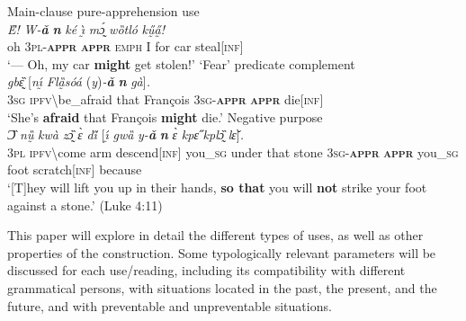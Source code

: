 \documentclass[output=paper,colorlinks,citecolor=brown]{langscibook}
\begin{document}
\ea \label{ex:Fed1} \textnormal{Main-clause pure-apprehension use} \\
\gll \textit{E̋!} \textit{W-\textbf{ǎ}} \textit{\textbf{n{\ù}}} \textit{ké} \textit{ı̰̀} \textit{mɔ̰́} \textit{wȍtló} \textit{kṵ̋a̰̋!} \\
oh \textsc{3pl-\textbf{appr}} \textsc{\textbf{appr}} \textsc{emph} I for car steal\textsc{[inf]} \\
 `--- Oh, my car \textbf{might} get stolen!'
\ex \label{ex:Fed2} \textnormal{`Fear' predicate complement}\\
\gll \textit{{\E}} \textit{gbɛ̰̏} \textup{[}\textit{n\'{ı̰}} \textit{Flȁ̰sóá} \textup{(}\textit{y}\textup{)}\textit{-\textbf{ǎ}} \textit{\textbf{n{\ù}}} \textit{gà}\textup{]}\textit{.} \\
\textsc{3sg} \textsc{\textsc{ipfv}\backslash}be\_afraid that François \textsc{3sg-\textbf{appr}} \textsc{\textbf{appr}} die\textsc{[inf]} \\
\glt `She's \textbf{afraid} that François \textbf{might} die.'
\ex \label{ex:Fed3} \textnormal{Negative purpose} \\
\gll \textit{Ɔ̏} \textit{nṵ̏} \textit{kwà} \textit{zɔ̰̏} \textit{ɛ̀} \textit{di̋} \textup{[}\textit{ı̰́} \textit{gwȁ} \textit{y-\textbf{ǎ}} \textit{\textbf{n{\ù}}} \textit{ɛ̀} \textit{kpɛ̋} \textit{kplɔ̰̏} \textit{lɛ̌}\textup{]}\textit{.} \\
\textsc{3pl} \textsc{ipfv}\backslash come arm descend\textsc{[inf]} {you\_\textsc{sg}} under that stone \textsc{3sg-\textbf{appr}} \textsc{\textbf{appr}} you\_\textsc{sg} foot scratch\textsc{[inf]} because \\
\glt `[T]hey will lift you up in their hands, \textbf{so that} you will \textbf{not} strike your foot against a stone.' (Luke 4:11)
\z


This paper will explore in detail the different types of uses, as well as other properties of the construction. Some typologically relevant parameters will be discussed for each use\slash reading, including its compatibility with different grammatical persons, with situations located in the past, the present, and the future, and with preventable and unpreventable situations.
\end{document}
